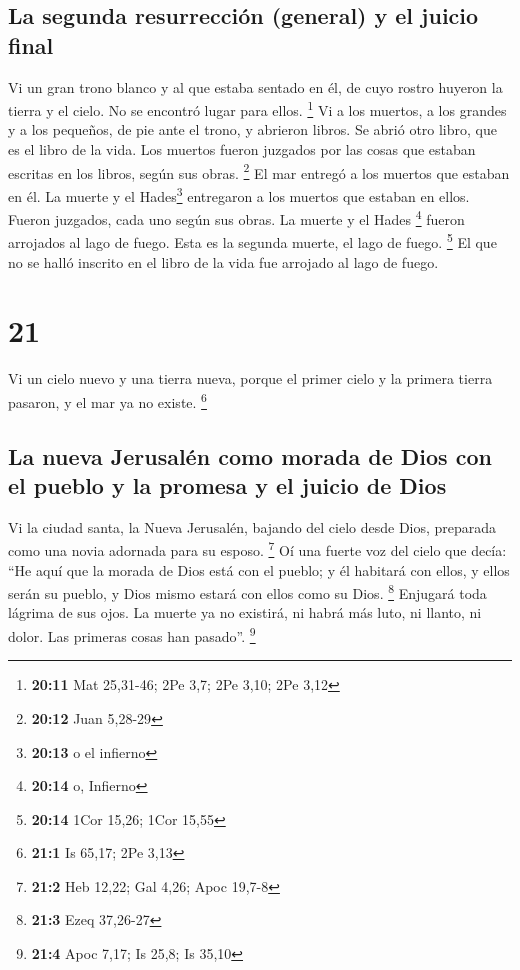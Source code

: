 \hypertarget{la-segunda-resurrecciuxf3n-general-y-el-juicio-final}{%
\subsection{La segunda resurrección (general) y el juicio
final}\label{la-segunda-resurrecciuxf3n-general-y-el-juicio-final}}

 Vi un gran trono blanco y al que estaba sentado en él,
de cuyo rostro huyeron la tierra y el cielo. No se encontró lugar para
ellos. \footnote{\textbf{20:11} Mat 25,31-46; 2Pe 3,7; 2Pe 3,10; 2Pe
  3,12}  Vi a los muertos, a los grandes y a los
pequeños, de pie ante el trono, y abrieron libros. Se abrió otro libro,
que es el libro de la vida. Los muertos fueron juzgados por las cosas
que estaban escritas en los libros, según sus obras. \footnote{\textbf{20:12}
  Juan 5,28-29}  El mar entregó a los muertos que estaban
en él. La muerte y el Hades\footnote{\textbf{20:13} o el infierno}
entregaron a los muertos que estaban en ellos. Fueron juzgados, cada uno
según sus obras.  La muerte y el Hades \footnote{\textbf{20:14}
  o, Infierno} fueron arrojados al lago de fuego. Esta es la segunda
muerte, el lago de fuego. \footnote{\textbf{20:14} 1Cor 15,26; 1Cor
  15,55}  El que no se halló inscrito en el libro de la
vida fue arrojado al lago de fuego.

\hypertarget{section-20}{%
\section{21}\label{section-20}}

 Vi un cielo nuevo y una tierra nueva, porque el primer
cielo y la primera tierra pasaron, y el mar ya no existe. \footnote{\textbf{21:1}
  Is 65,17; 2Pe 3,13}

\hypertarget{la-nueva-jerusaluxe9n-como-morada-de-dios-con-el-pueblo-y-la-promesa-y-el-juicio-de-dios}{%
\subsection{La nueva Jerusalén como morada de Dios con el pueblo y la
promesa y el juicio de
Dios}\label{la-nueva-jerusaluxe9n-como-morada-de-dios-con-el-pueblo-y-la-promesa-y-el-juicio-de-dios}}

 Vi la ciudad santa, la Nueva Jerusalén, bajando del cielo
desde Dios, preparada como una novia adornada para su esposo.
\footnote{\textbf{21:2} Heb 12,22; Gal 4,26; Apoc 19,7-8} 
Oí una fuerte voz del cielo que decía: ``He aquí que la morada de Dios
está con el pueblo; y él habitará con ellos, y ellos serán su pueblo, y
Dios mismo estará con ellos como su Dios. \footnote{\textbf{21:3} Ezeq
  37,26-27}  Enjugará toda lágrima de sus ojos. La muerte
ya no existirá, ni habrá más luto, ni llanto, ni dolor. Las primeras
cosas han pasado''. \footnote{\textbf{21:4} Apoc 7,17; Is 25,8; Is 35,10}

